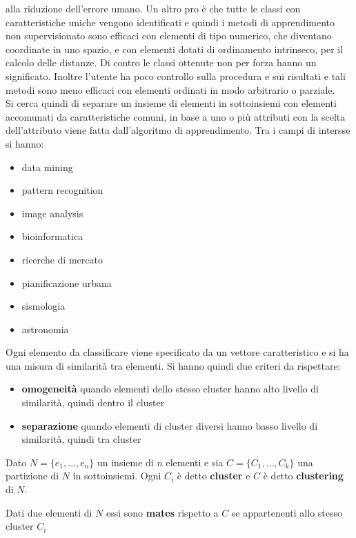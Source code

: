 \documentclass[a4paper,12pt, oneside]{book}
\begin{document}
alla riduzione dell'errore umano. Un altro pro è che tutte le classi con
caratteristiche uniche vengono identificati e quindi i metodi di apprendimento
non supervisionato sono efficaci con elementi di tipo numerico, che diventano
coordinate in uno spazio, e con elementi dotati di ordinamento intrinseco, per
il calcolo delle distanze. Di contro le classi ottenute non per forza hanno un
significato. Inoltre l'utente ha poco controllo sulla procedura e sui risultati
e tali metodi sono meno efficaci con elementi ordinati in modo arbitrario o
parziale. \\
Si cerca quindi di separare un insieme di elementi in sottoinsiemi con elementi
accomunati da caratteristiche comuni, in base a uno o più attributi con la
scelta dell'attributo viene fatta dall'algoritmo di apprendimento. Tra i campi
di intersse si hanno:
\begin{itemize}
  \item data mining
  \item pattern recognition
  \item image analysis 
  \item bioinformatica 
  \item ricerche di mercato
  \item pianificazione urbana 
  \item sismologia 
  \item astronomia
\end{itemize}
Ogni elemento da classificare viene specificato da un vettore caratteristico e
si ha una misura di similarità tra elementi. Si hanno quindi due criteri da 
rispettare:
\begin{itemize}
  \item \textbf{omogeneità} quando elementi dello stesso cluster hanno alto
  livello di similarità, quindi dentro il cluster
  \item \textbf{separazione} quando elementi di cluster diversi hanno basso
  livello di similarità, quindi tra cluster
\end{itemize}
\begin{definizione}
  Dato $N=\{e_1,\ldots,e_n\}$ un insieme di $n$ elementi e sia
  $C=\{C_1,\ldots,C_k\}$ una partizione di $N$ in sottoinsiemi. Ogni $C_i$ è
  detto \textbf{cluster} e $C$ è detto \textbf{clustering} di $N$.
\end{definizione}
\begin{definizione}
  Dati due elementi di $N$ essi sono \textbf{mates} rispetto a $C$ se
  appartenenti allo stesso cluster $C_i$
\end{definizione}
\end{document}
